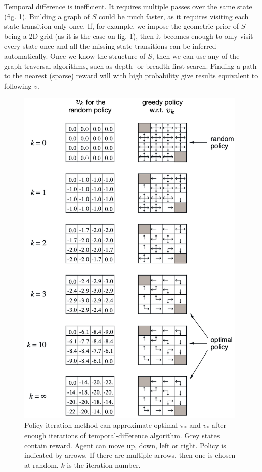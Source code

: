 \documentclass[12pt]{article}
\begin{document}
Temporal difference is inefficient. It requires multiple passes over the same state (fig. \ref{fig:dynamic_programming}). Building a graph of $S$ could be much faster, as it requires visiting each state transition only once. If, for example, we impose the geometric prior of $S$ being a 2D grid (as it is the case on fig. \ref{fig:dynamic_programming}), then it becomes enough to only visit every state once and all the missing state transitions can be inferred automatically. Once we know the structure of $S$, then we can use any of the graph-traversal algorithms, such as depth- or breadth-first search. Finding a path to the nearest (sparse) reward will with high probability give results equivalent to following $v$.
\begin{figure}[!htbp]
	\centering
	\includegraphics[width=11cm]{dynamic_programming}
	\caption{Policy iteration method can approximate optimal $\pi_*$ and $v_*$ after enough iterations of temporal-difference algorithm. Grey states contain reward. Agent can move up, down, left or right. Policy is indicated by arrows. If there are multiple arrows, then one is chosen at random. $k$ is the iteration number.}
	\label{fig:dynamic_programming}
\end{figure}
\end{document}
